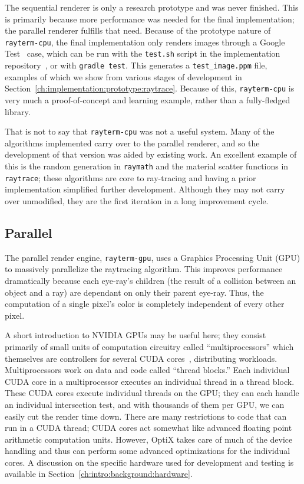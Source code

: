 The sequential renderer is only a research prototype and was never finished.
This is primarily because more performance was needed for the final \name{} implementation; the parallel renderer fulfills that need.
Because of the prototype nature of \texttt{rayterm-cpu}, the final implementation only renders images through a Google Test~\cite{googletest} case, which can be run with the \texttt{test.sh} script in the implementation repository~\cite{raytermCpuImpl}, or with \texttt{gradle test}.
This generates a \texttt{test\_image.ppm} file, examples of which we show from various stages of development in Section~\ref{ch:implementation:prototype:raytrace}.
Because of this, \texttt{rayterm-cpu} is very much a proof-of-concept and learning example, rather than a fully-fledged library.

That is not to say that \texttt{rayterm-cpu} was not a useful system.
Many of the algorithms implemented carry over to the parallel renderer, and so the development of that version was aided by existing work.
An excellent example of this is the random generation in \texttt{raymath} and the material scatter functions in \texttt{raytrace}; these algorithms are core to ray-tracing and having a prior implementation simplified further development.
Although they may not carry over unmodified, they are the first iteration in a long improvement cycle.

\subsection{Parallel}
\label{ch:methods:renderer:parallel}

The parallel render engine, \texttt{rayterm-gpu}, uses a Graphics Processing Unit (GPU) to massively parallelize the raytracing algorithm.
This improves performance dramatically because each eye-ray's children (the result of a collision between an object and a ray) are dependant on only their parent eye-ray.
Thus, the computation of a single pixel's color is completely independent of every other pixel.

A short introduction to NVIDIA GPUs may be useful here; they consist primarily of small units of computation circuitry called ``multiprocessors'' which themselves are controllers for several CUDA cores~\cite{fermi2009nvidia}, distributing workloads.
Multiprocessors work on data and code called ``thread blocks.''
Each individual CUDA core in a multiprocessor executes an individual thread in a thread block.
These CUDA cores execute individual threads on the GPU; they can each handle an individual intersection test, and with thousands of them per GPU, we can easily cut the render time down.
There are many restrictions to code that can run in a CUDA thread; CUDA cores act somewhat like advanced floating point arithmetic computation units.
However, OptiX takes care of much of the device handling and thus can perform some advanced optimizations for the individual cores.
A discussion on the specific hardware used for development and testing is available in Section~\ref{ch:intro:background:hardware}.

